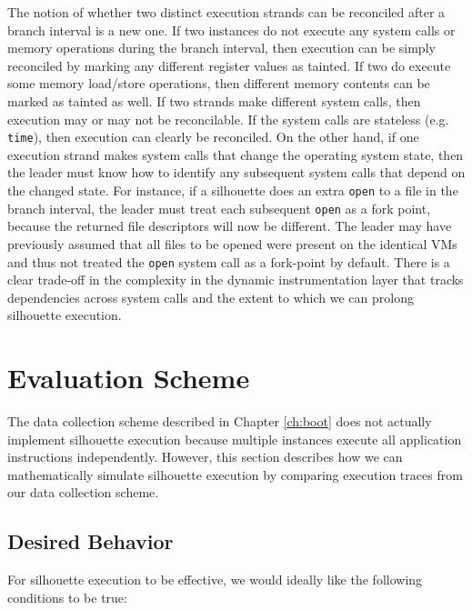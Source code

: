 The notion of whether two distinct execution strands can be reconciled
after a branch interval is a new one.
If two instances do not execute
any system calls or memory operations
during the branch interval, then
execution can be simply reconciled
by marking any different register
values as tainted. If two
do execute some memory load/store
operations, then different
memory contents can be marked
as tainted as well. 
If two strands make different system
calls, then execution may
or may not be reconcilable. 
If the system calls are stateless (e.g. \texttt{time}),
then execution can clearly be reconciled.
On the other hand, if one execution strand
makes system calls that change the operating
system state, then the leader must
know how to identify any subsequent
system calls that depend on the changed state.
For instance, if a silhouette does an
extra \texttt{open} to a
file in the branch interval, the leader
must treat each subsequent \texttt{open}
as a fork point, because
the returned file descriptors
will now be different. The
leader may have previously
assumed that all files to be opened were present
on the identical VMs and thus not
treated the \texttt{open} system call
as a fork-point by default.
There is a clear trade-off in the complexity
in the dynamic instrumentation layer that tracks
dependencies across system calls and
the extent to which we can 
prolong silhouette execution.

\section{Evaluation Scheme} \label{silsimulation}
The data collection scheme described in Chapter \ref{ch:boot} does not
actually implement silhouette execution 
because multiple instances execute all application instructions independently.
However, this section describes how 
we can mathematically simulate silhouette execution 
by comparing execution traces from our data collection scheme.

\subsection{Desired Behavior}
For silhouette execution to be effective,
we would ideally like the following
conditions to be true:

